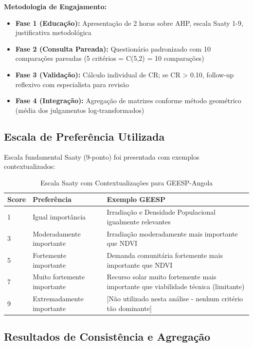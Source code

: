 \documentclass[12pt, a4paper]{article}
\begin{document}
\begin{itemize}
\textbf{Metodologia de Engajamento:}
\begin{itemize}
    \item \textbf{Fase 1 (Educação):} Apresentação de 2 horas sobre AHP, escala Saaty 1-9, justificativa metodológica
    \item \textbf{Fase 2 (Consulta Pareada):} Questionário padronizado com 10 comparações pareadas (5 critérios = C(5,2) = 10 comparações)
    \item \textbf{Fase 3 (Validação):} Cálculo individual de CR; se CR > 0.10, follow-up reflexivo com especialista para revisão
    \item \textbf{Fase 4 (Integração):} Agregação de matrizes conforme método geométrico (média dos julgamentos log-transformados)
\end{itemize}

\subsection{Escala de Preferência Utilizada}

Escala fundamental Saaty (9-ponto) foi presentada com exemplos contextualizados:

\begin{table}[H]
\centering
\small
\caption{Escala Saaty com Contextualizações para GEESP-Angola}
\label{tab:saaty_scale}
\begin{tabular}{|l|p{3cm}|p{4cm}|}
\hline
\textbf{Score} & \textbf{Preferência} & \textbf{Exemplo GEESP} \\
\hline
1 & Igual importância & Irradiação e Densidade Populacional igualmente relevantes \\
3 & Moderadamente importante & Irradiação moderadamente mais importante que NDVI \\
5 & Fortemente importante & Demanda comunitária fortemente mais importante que NDVI \\
7 & Muito fortemente importante & Recurso solar muito fortemente mais importante que viabilidade técnica (limitante) \\
9 & Extremadamente importante & [Não utilizado nesta análise - nenhum critério tão dominante] \\
\hline
\end{tabular}
\end{table}

\subsection{Resultados de Consistência e Agregação}


\end{itemize}
\end{document}
